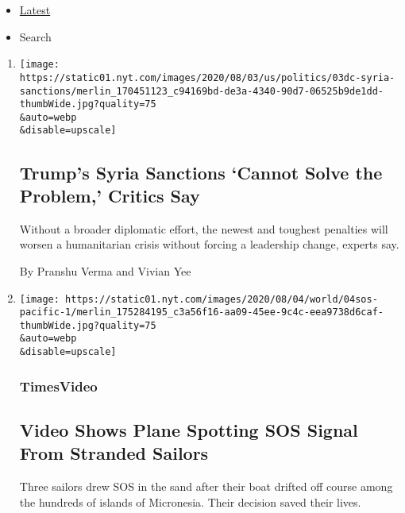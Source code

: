 \begin{itemize}
\tightlist
\item
  \protect\hyperlink{stream-panel}{Latest}
\item
  Search
\end{itemize}

\begin{enumerate}
\def\labelenumi{\arabic{enumi}.}
\item
  \href{/2020/08/04/world/middleeast/trump-assad-syria-sanctions.html}{}

  \texttt{[image: https://static01.nyt.com/images/2020/08/03/us/politics/03dc-syria-sanctions/merlin\_170451123\_c94169bd-de3a-4340-90d7-06525b9de1dd-thumbWide.jpg?quality=75\\\&auto=webp\\\&disable=upscale]}

  \hypertarget{trumps-syria-sanctions-cannot-solve-the-problem-critics-say}{%
  \subsection{Trump's Syria Sanctions `Cannot Solve the Problem,'
  Critics
  Say}\label{trumps-syria-sanctions-cannot-solve-the-problem-critics-say}}

  Without a broader diplomatic effort, the newest and toughest penalties
  will worsen a humanitarian crisis without forcing a leadership change,
  experts say.

  By Pranshu Verma and Vivian Yee
\item
  \href{/video/world/100000007271927/pacific-island-rescue-video.html}{}

  \texttt{[image: https://static01.nyt.com/images/2020/08/04/world/04sos-pacific-1/merlin\_175284195\_c3a56f16-aa09-45ee-9c4c-eea9738d6caf-thumbWide.jpg?quality=75\\\&auto=webp\\\&disable=upscale]}

  \hypertarget{timesvideo}{%
  \subsubsection{TimesVideo}\label{timesvideo}}

  \hypertarget{video-shows-plane-spotting-sos-signal-from-stranded-sailors}{%
  \subsection{Video Shows Plane Spotting SOS Signal From Stranded
  Sailors}\label{video-shows-plane-spotting-sos-signal-from-stranded-sailors}}

  Three sailors drew SOS in the sand after their boat drifted off course
  among the hundreds of islands of Micronesia. Their decision saved
  their lives.


\end{enumerate}
